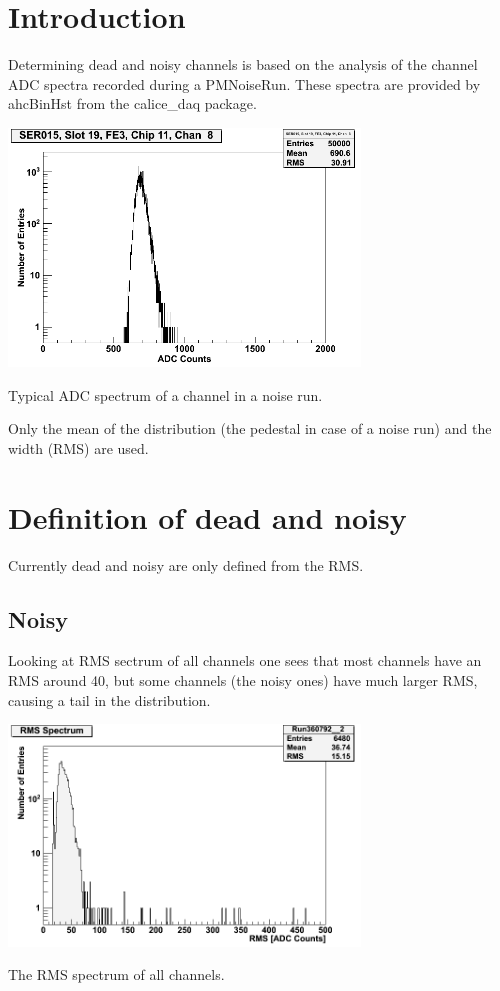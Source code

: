 \hypertarget{index_Introduction}{}\section{Introduction}\label{index_Introduction}
Determining dead and noisy channels is based on the analysis of the channel ADC spectra recorded during a PMNoiseRun. These spectra are provided by {\ttfamily ahcBinHst} from the {\ttfamily calice\_\-daq} package.

 
\begin{DoxyImage}
\includegraphics[width=0.7\textwidth]{normal_channel_spectrum.png}
\caption{Typical ADC spectrum of a channel in a noise run.}
\end{DoxyImage}


Only the mean of the distribution (the pedestal in case of a noise run) and the width (RMS) are used.\hypertarget{index_Definition}{}\section{Definition of dead and noisy}\label{index_Definition}
Currently dead and noisy are only defined from the RMS. \hypertarget{index_Noisy}{}\subsection{Noisy}\label{index_Noisy}
Looking at RMS sectrum of all channels one sees that most channels have an RMS around 40, but some channels (the noisy ones) have much larger RMS, causing a tail in the distribution.

 
\begin{DoxyImage}
\includegraphics[width=0.7\textwidth]{rms_spectrum.png}
\caption{The RMS spectrum of all channels.}
\end{DoxyImage}


